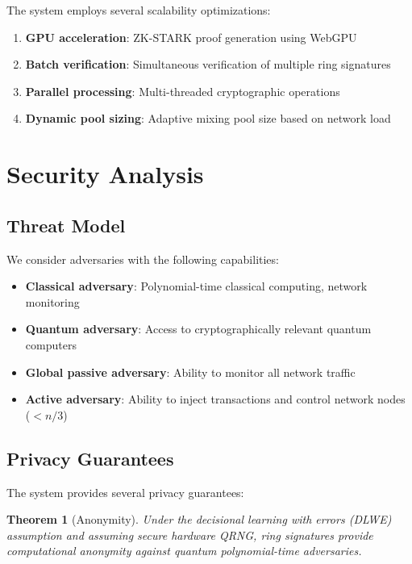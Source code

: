 \documentclass[12pt,a4paper]{article}
\newtheorem{theorem}{Theorem}[section]
\begin{document}
The system employs several scalability optimizations:

\begin{enumerate}
\item \textbf{GPU acceleration}: ZK-STARK proof generation using WebGPU
\item \textbf{Batch verification}: Simultaneous verification of multiple ring signatures
\item \textbf{Parallel processing}: Multi-threaded cryptographic operations
\item \textbf{Dynamic pool sizing}: Adaptive mixing pool size based on network load
\end{enumerate}

\section{Security Analysis}

\subsection{Threat Model}

We consider adversaries with the following capabilities:

\begin{itemize}
\item \textbf{Classical adversary}: Polynomial-time classical computing, network monitoring
\item \textbf{Quantum adversary}: Access to cryptographically relevant quantum computers
\item \textbf{Global passive adversary}: Ability to monitor all network traffic
\item \textbf{Active adversary}: Ability to inject transactions and control network nodes ($< n/3$)
\end{itemize}

\subsection{Privacy Guarantees}

The system provides several privacy guarantees:

\begin{theorem}[Anonymity]
Under the decisional learning with errors (DLWE) assumption and assuming secure hardware QRNG, ring signatures provide computational anonymity against quantum polynomial-time adversaries.
\end{theorem}
\end{document}
